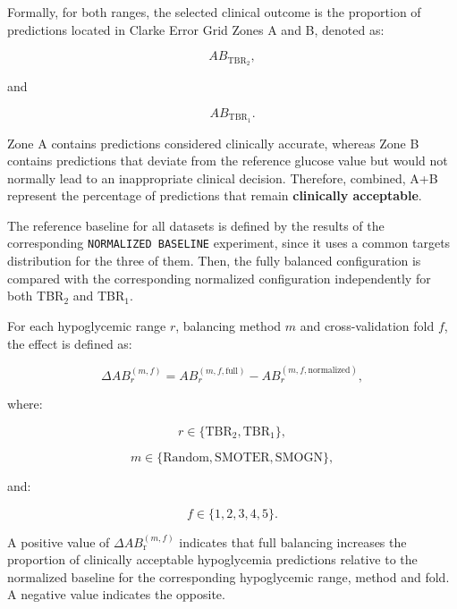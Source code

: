 Formally, for both ranges, the selected clinical outcome is the proportion of predictions located in Clarke Error Grid Zones A and B, denoted as:

\begin{equation}
AB_{\mathrm{TBR_2}},
\end{equation}

and

\begin{equation}
AB_{\mathrm{TBR_1}}.
\end{equation}

Zone A contains predictions considered clinically accurate, whereas Zone B contains predictions that deviate from the reference glucose value but would not normally lead to an inappropriate clinical decision. Therefore, combined, A+B represent the percentage of predictions that remain \textbf{clinically acceptable}.

The reference baseline for all datasets is defined by the results of the corresponding \texttt{NORMALIZED BASELINE} experiment, since it uses a common targets distribution for the three of them. Then, the fully balanced configuration is compared with the corresponding normalized configuration independently for both TBR$_2$ and TBR$_1$.

For each hypoglycemic range \(r\), balancing method \(m\) and cross-validation fold \(f\), the effect
is defined as:

\begin{equation}
\Delta AB_{r}^{(m,f)}
=
AB_{r}^{(m,f,\mathrm{full})}
-
AB_{r}^{(m,f,\mathrm{normalized})},
\label{eq:delta_ab_hypo}
\end{equation}

where:

\begin{equation}
r \in \{\mathrm{TBR_2}, \mathrm{TBR_1}\},
\end{equation}

\begin{equation}
m
\in
\{
\mathrm{Random},
\mathrm{SMOTER},
\mathrm{SMOGN}
\},
\end{equation}

and:

\begin{equation}
f \in \{1,2,3,4,5\}.
\end{equation}

A positive value of \(\Delta AB_{\mathrm{r}}^{(m,f)}\) indicates that full balancing increases the proportion of clinically acceptable hypoglycemia predictions relative to the normalized baseline for the corresponding hypoglycemic range, method and fold. A negative value indicates the opposite.

